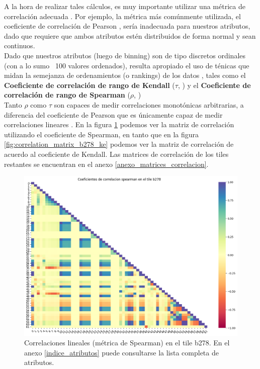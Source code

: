 A la hora de realizar tales cálculos, es muy importante utilizar una métrica de correlación adecuada \cite{how_to_choose_correlation}. Por ejemplo, la métrica más comúnmente utilizada, el coeficiente de correlación de Pearson \cite{pagano2010understanding}, sería inadecuada para nuestros atributos, dado que requiere que ambos atributos estén distribuidos de forma normal y sean continuos. \\

Dado que nuestros atributos (luego de binning) son de tipo discretos ordinales (con a lo sumo ~100 valores ordenados), resulta apropiado el uso de ténicas que midan la semejanza de ordenamientos (o rankings) de los datos  \cite{how_to_choose_correlation} \cite{pagano2010understanding}, tales como el \textbf{Coeficiente de correlación de rango de Kendall} ($\tau$, \cite{kendall_spearman}) y el \textbf{Coeficiente de correlación de rango de Spearman} ($\rho$, \cite{kendall_spearman}) \\

Tanto $\rho$ como $\tau$ son capaces de medir correlaciones monotónicas arbitrarias, a diferencia del coeficiente de Pearson que es únicamente capaz de medir correlaciones lineares \cite{pagano2010understanding}. En la figura \ref{fig:correlation_matrix_b278_sp} podemos ver la matriz de correlación utilizando el coeficiente de Spearman, en tanto que en la figura \ref{fig:correlation_matrix_b278_ke} podemos ver la matriz de correlación de acuerdo al coeficiente de Kendall. Las matrices de correlación de los tiles restantes se encuentran en el anexo \ref{anexo_matrices_correlacion}. \\

\begin{figure}[h!]
\centering
  \includegraphics[width=1\textwidth]{Kap6/spearman_b278_MATRIX.png}
\caption{ Correlaciones lineales (métrica de Spearman) en el tile b278. En el anexo \protect\ref{indice_atributos} puede consultarse la lista completa de atributos. }
\label{fig:correlation_matrix_b278_sp}
\end{figure}

